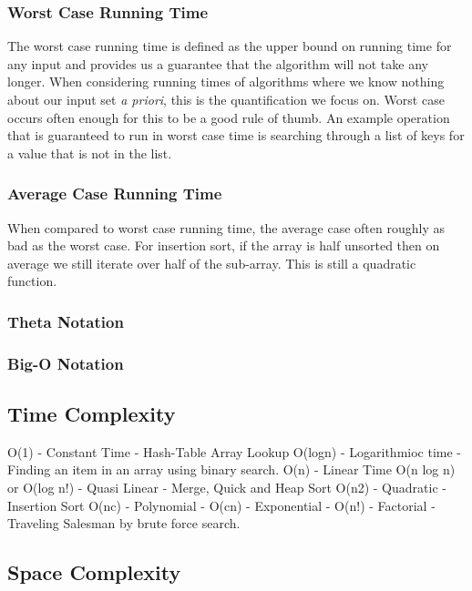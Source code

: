 \documentclass[10pt,a4paper]{article}
\begin{document}
\subsubsection{Worst Case Running Time}
The worst case running time is defined as the upper bound on running time for any input and provides us a guarantee that the algorithm will not take any longer. When considering running times of algorithms where we know nothing about our input set {\it a priori}, this is the quantification we focus on. Worst case occurs often enough for this to be a good rule of thumb. An example operation that is guaranteed to run in worst case time is searching through a list of keys for a value that is not in the list. 
\subsubsection{Average Case Running Time}
When compared to worst case running time, the average case often roughly as bad as the worst case. For insertion sort, if the array is half unsorted then on average we still iterate over half of the sub-array. This is still a quadratic function. 
\subsubsection{Theta Notation}
\subsubsection{Big-O Notation} 

\subsection{Time Complexity}

O(1) - Constant Time - Hash-Table Array Lookup
O(logn) - Logarithmioc time - Finding an item in an array using binary search.
O(n) - Linear Time
O(n log n) or O(log n!) - Quasi Linear - Merge, Quick and Heap Sort
O(n2) - Quadratic - Insertion Sort
O(nc) - Polynomial -
O(cn) - Exponential - 
O(n!) - Factorial - Traveling Salesman by brute force search.

\subsection{Space Complexity}
\end{document}

